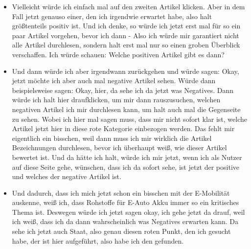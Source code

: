 {\begin{itemize}[]
                  Einfach den Ersten.
                  \flqq Stromverbrauch: So viel verbraucht ein E-Auto wirklich\frqq{} und dann würde ich mir den halt angucken.
                  Okay, und hier sehe ich jetzt auch noch mal genau, zu welchen Kategorien der Artikel gehört, was natürlich cool ist.
                  Und dann sehe ich auch okay, jetzt habe ich auch genau so einen erwischt, wie ich eigentlich erwartet habe, der in allen Fällen positiv ist.
                  Ich würde mir den durchlesen und dann halt wieder zurück zu der Übersicht gehen und mich so ein bisschen durcharbeiten.
            \item {} Vielleicht würde ich einfach mal auf den zweiten Artikel klicken.
                  Aber in dem Fall jetzt genauso einer, den ich irgendwie erwartet habe, also halt größtenteils positiv ist.
                  Und ich denke, so würde ich jetzt erst mal für so ein paar Artikel vorgehen, bevor ich dann - Also ich würde mir garantiert nicht alle Artikel durchlesen, sondern halt erst mal nur so einen groben Überblick verschaffen.
                  Ich würde schauen: Welche positiven Artikel gibt es dann?
            \item {} Und dann würde ich aber irgendwann zurückgehen und würde sagen: Okay, jetzt möchte ich aber auch mal negative Artikel sehen.
                  Würde dann beispielsweise sagen: Okay, hier, da sehe ich da jetzt was Negatives.
                  Dann würde ich halt hier draufklicken, um mir dann rauszusuchen, welchen negativen Artikel ich mir durchlesen kann, um halt auch mal die Gegenseite zu sehen.
                  Wobei ich hier mal sagen muss, dass mir nicht sofort klar ist, welche Artikel jetzt hier in diese rote Kategorie einbezogen werden.
                  Das fehlt mir eigentlich ein bisschen, weil dann muss ich mir wirklich die Artikel Bezeichnungen durchlesen, bevor ich überhaupt weiß, wie dieser Artikel bewertet ist.
                  Und da hätte ich halt, würde ich mir jetzt, wenn ich als Nutzer auf diese Seite gehe, wünschen, dass ich da sofort sehe, ist jetzt der positive und welches der negative Artikel ist.
            \item {} Und dadurch, dass ich mich jetzt schon ein bisschen mit der E-Mobilität auskenne, weiß ich, dass Rohstoffe für E-Auto Akku immer so ein kritisches Thema ist.
                  Deswegen würde ich jetzt sagen okay, ich gehe jetzt da drauf, weil ich weiß, dass ich da dann wahrscheinlich was Negatives erwarten kann.
                  Da sehe ich jetzt auch Staat, also genau diesen roten Punkt, den ich gesucht habe, der ist hier aufgeführt, also habe ich den gefunden.

\end{itemize}}
